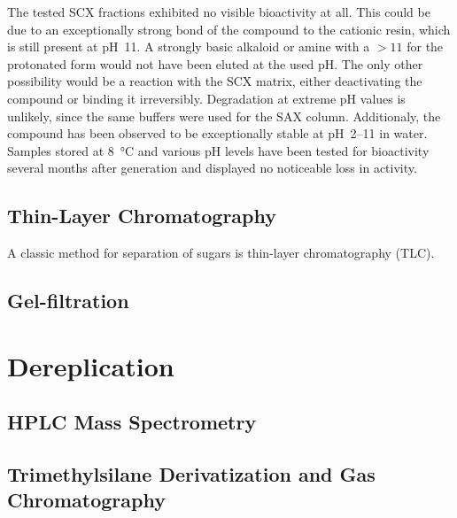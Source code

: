 	The tested SCX fractions exhibited no visible bioactivity at all.
	This could be due to an exceptionally strong bond of the compound to the cationic resin, which is still present at pH~11.
	A strongly basic alkaloid or amine with a \pka$>11$ for the protonated form would not have been eluted at the used pH.
	The only other possibility would be a reaction with the SCX matrix, either deactivating the compound or binding it irreversibly.
	Degradation at extreme pH values is unlikely, since the same buffers were used for the SAX column.
	Additionaly, the compound has been observed to be exceptionally stable at pH~2--11 in water.
	Samples stored at \SI{8}{\celsius} and various pH levels have been tested for bioactivity several months after generation and displayed no noticeable loss in activity.
	
	
	

\subsection{Thin-Layer Chromatography} %
\label{sub:results_thin_layer_chromatography}
    
    
    A classic method for separation of sugars is thin-layer chromatography (TLC).

    
    \subsection{Gel-filtration} %
    \label{sub:results_gel_filtration}


\section{Dereplication} %
\label{sec:dereplication}

    \subsection{HPLC Mass Spectrometry} %
    \label{sub:hplc_mass_spectrometry}


    \subsection{Trimethylsilane Derivatization and Gas Chromatography} %
    \label{sub:trimethylsilane_derivatization_and_gas_chromatography_results}

